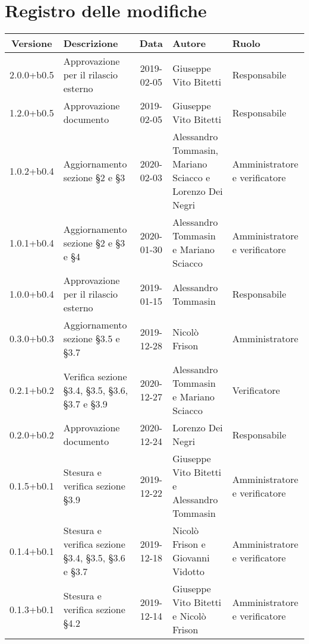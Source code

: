 \section*{Registro delle modifiche}

\begin{center}
	\begin{longtable}{|c|p{3.5cm}|c|p{3cm}|p{3cm}|}
	\hline
	\rowcolor{lighter-grayer}
	\textbf{Versione} & \textbf{Descrizione} & \textbf{Data} & \textbf{Autore} & \textbf{Ruolo} \\
	\hline
	\endfirsthead



	2.0.0+b0.5 & Approvazione per il rilascio esterno & 2019-02-05 & Giuseppe Vito Bitetti & Responsabile \\
	\hline
	1.2.0+b0.5 & Approvazione documento & 2019-02-05 & Giuseppe Vito Bitetti & Responsabile \\
	\hline
	1.0.2+b0.4 & Aggiornamento sezione \S2 e \S3 & 2020-02-03 & Alessandro Tommasin, Mariano Sciacco e Lorenzo Dei Negri & Amministratore e verificatore \\
	\hline
	1.0.1+b0.4 & Aggiornamento sezione \S2 e \S3 e \S4 & 2020-01-30 & Alessandro Tommasin e Mariano Sciacco & Amministratore e verificatore \\
	\hline
	1.0.0+b0.4 & Approvazione per il rilascio esterno & 2019-01-15 & Alessandro Tommasin & Responsabile \\
	\hline
	0.3.0+b0.3 & Aggiornamento sezione \S3.5 e \S3.7 & 2019-12-28 & Nicolò Frison & Amministratore \\
	\hline
	0.2.1+b0.2 & Verifica sezione \S3.4, \S3.5, \S3.6, \S3.7 e \S3.9 & 2020-12-27 & Alessandro Tommasin e Mariano Sciacco & Verificatore\\
  \hline
	0.2.0+b0.2 & Approvazione documento & 2020-12-24 & Lorenzo Dei Negri & Responsabile \\
	\hline
	0.1.5+b0.1 & Stesura e verifica sezione \S3.9 & 2019-12-22 & Giuseppe Vito Bitetti e Alessandro Tommasin  & Amministratore e verificatore \\
	\hline
	0.1.4+b0.1 & Stesura e verifica sezione \S3.4, \S3.5, \S3.6 e \S3.7 & 2019-12-18 & Nicolò Frison e Giovanni Vidotto & Amministratore e verificatore \\
	\hline
	0.1.3+b0.1 & Stesura e verifica sezione \S4.2 & 2019-12-14 & Giuseppe Vito Bitetti e Nicolò Frison & Amministratore e verificatore \\
	\hline

\end{longtable}
\end{center}
